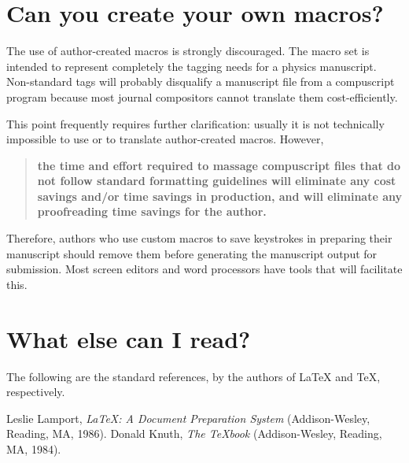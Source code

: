\section{Can you create your own macros?}

The use of author-created macros is strongly discouraged. The \REVTeX{}
macro set is intended to represent completely the tagging needs for a
physics manuscript. Non-standard tags will probably disqualify a manuscript
file from a compuscript program because most journal compositors cannot
translate them cost-efficiently.

This point frequently requires further clarification: usually it is not
technically impossible to use or to translate author-created macros.
However,

\begin{quote}
{\bf the time and effort required to massage compuscript files that do not
follow standard formatting guidelines will eliminate any cost savings
and/or time savings in production, and will eliminate any proofreading time
savings for the author.}
\end{quote}

Therefore, authors who use custom macros to save keystrokes in preparing
their manuscript should remove them before generating the manuscript output
for submission.  Most screen editors and word processors have tools that
will facilitate this.

\section{What else can I read?}

The following are the standard references, by the authors of \LaTeX{} and
\TeX{}, respectively.


\begin{references}
Leslie Lamport, {\it \LaTeX: A Document Preparation
System} (Addison-Wesley, Reading, MA, 1986).
Donald Knuth, {\it The \TeX book} (Addison-Wesley,
Reading, MA, 1984).
\end{references}



